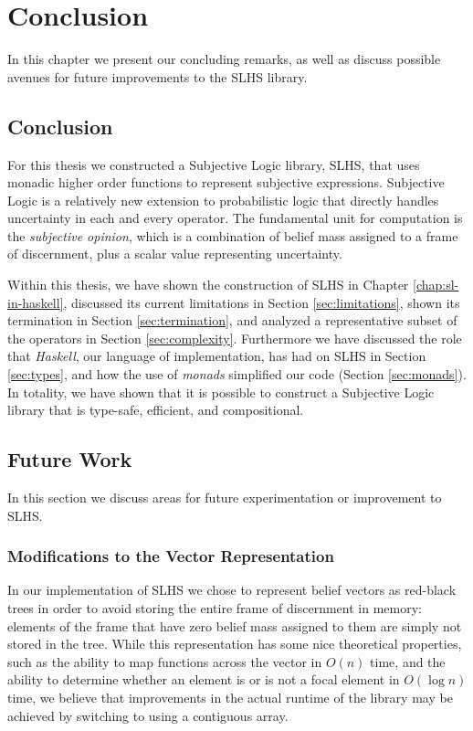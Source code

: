\documentclass[thesis.tex]{subfiles}
\begin{document}
\chapter{Conclusion}
\label{chap:conclusion}

In this chapter we present our concluding remarks, as well as discuss possible avenues for
future improvements to the SLHS library.



\section{Conclusion}

For this thesis we constructed a Subjective Logic library, SLHS, that uses monadic higher
order functions to represent subjective expressions. Subjective Logic is a relatively new
extension to probabilistic logic \cite{josang2001logic} that directly handles uncertainty
in each and every operator. The fundamental unit for computation is the \emph{subjective opinion},
which is a combination of belief mass assigned to a frame of discernment, plus a scalar value
representing uncertainty.

Within this thesis, we have shown the construction of SLHS in Chapter \ref{chap:sl-in-haskell},
discussed its current limitations in Section \ref{sec:limitations}, shown its termination in
Section \ref{sec:termination}, and analyzed a representative subset of the operators in
Section \ref{sec:complexity}. Furthermore we have discussed the role that \emph{Haskell}, our
language of implementation, has had on SLHS in Section \ref{sec:types}, and how the use of
\emph{monads} simplified our code (Section \ref{sec:monads}). In totality, we have shown that it
is possible to construct a Subjective Logic library that is type-safe, efficient, and compositional.



\section{Future Work}

In this section we discuss areas for future experimentation or improvement to SLHS.


\subsection{Modifications to the Vector Representation}

In our implementation of SLHS we chose to represent belief vectors as red-black trees in
order to avoid storing the entire frame of discernment in memory: elements of the frame
that have zero belief mass assigned to them are simply not stored in the tree. While this
representation has some nice theoretical properties, such as the ability to map functions
across the vector in $O (n)$ time, and the ability to determine whether an element is or is
not a focal element in $O (\log n)$ time, we believe that improvements in the actual runtime
of the library may be achieved by switching to using a contiguous array.
\end{document}
